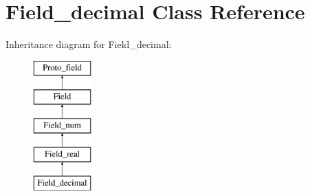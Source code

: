\hypertarget{classField__decimal}{}\section{Field\+\_\+decimal Class Reference}
\label{classField__decimal}
Inheritance diagram for Field\+\_\+decimal\+:\begin{figure}[H]
\begin{center}
\leavevmode
\includegraphics[height=5.000000cm]{classField__decimal}
\end{center}
\end{figure}
